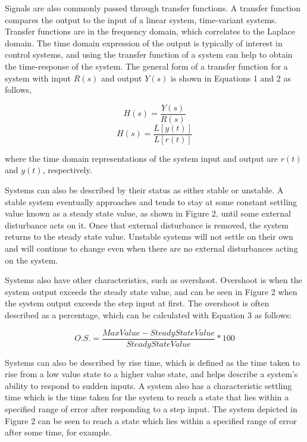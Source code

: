 \documentclass[12pt]{article}
\begin{document}
Signals are also commonly passed through transfer functions. A transfer function compares the output to the input of a linear system, time-variant systems. Transfer functions are in the frequency domain, which correlates to the Laplace domain. The time domain expression of the output is typically of interest in control systems, and using the transfer function of a system can help to obtain the time-response of the system. The general form of a transfer function for a system with input $R(s)$ and output $Y(s)$ is shown in Equations 1 and 2 as follows,

\begin{equation}
H(s) = \frac{Y(s)}{R(s)} 
\end{equation}
\begin{equation}
H(s) = \frac{L[y(t)]}{L[r(t)]}
\end{equation}
\bigskip

where the time domain representations of the system input and output are $r(t)$ and $y(t)$, respectively.
\bigskip

Systems can also be described by their status as either stable or unstable. A stable system eventually approaches and tends to stay at some constant settling value known as a steady state value, as shown in Figure 2, until some external disturbance acts on it. Once that external disturbance is removed, the system returns to the steady state value. Unstable systems will not settle on their own and will continue to change even when there are no external disturbances acting on the system.
\bigskip

Systems also have other characteristics, such as overshoot. Overshoot is when the system output exceeds the steady state value, and can be seen in Figure 2 when the system output exceeds the step input at first. The overshoot is often described as a percentage, which can be calculated with Equation 3 as follows:

\begin{equation}
O.S. = \frac{Max Value - Steady State Value}{Steady State Value}*100
\end{equation}

Systems can also be described by rise time, which is defined as the time taken to rise from a low value state to a higher value state, and helps describe a system's ability to respond to sudden inputs. A system also has a characteristic settling time which is the time taken for the system to reach a state that lies within a specified range of error after responding to a step input. The system depicted in Figure 2 can be seen to reach a state which lies within a specified range of error after some time, for example.
\newpage
\end{document}

